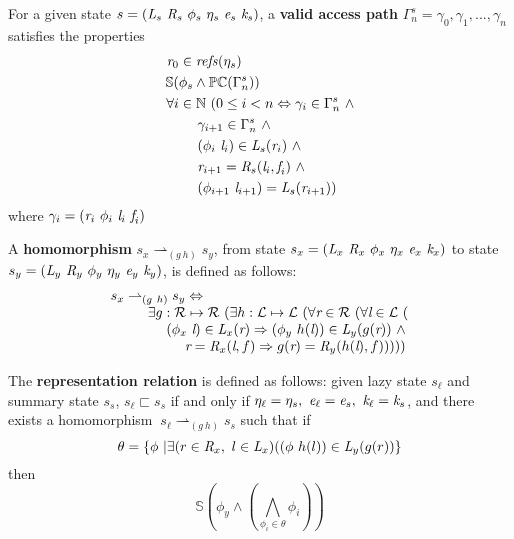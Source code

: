 \begin{definition}
For a given state $s= ( \cfgnt{L}_s\ \cfgnt{R}_s\ \phi_s\ \eta_s\ \cfgnt{e}_s\ \cfgnt{k}_s )$, a \textbf{valid access path} $\Gamma_n^s = \gamma_0,\gamma_1,...,\gamma_n$ satisfies the properties
\begin{align*}
\cfgnt{r}_0 &\in \mathit{refs}(\eta_s) \\
\mathbb{S}(&\phi_s \wedge \mathbb{PC}(\Gamma_n^s)) \\
\forall i & \in \mathbb{N}\ ( 0 \leq i < n \Leftrightarrow \gamma_i \in \Gamma_n^s\  \wedge\\
&\ \ \ \  \gamma_{i+1} \in \Gamma_n^s\  \wedge\\
&\ \ \ \  (\phi_i\ \cfgnt{l}_i)\in \cfgnt{L}_s(\cfgnt{r}_i)\ \wedge \\
&\ \ \ \  \cfgnt{r}_{i+1} = \cfgnt{R}_s(\cfgnt{l}_i,\cfgnt{f}_i)\ \wedge\\
&\ \ \ \ (\phi_{i+1}\ \cfgnt{l}_{i+1}) = \cfgnt{L}_s(\cfgnt{r}_{i+1}) )
\end{align*}
where $\gamma_i = (\emph{r}_i\ \phi_i\ \emph{l}_i\ \emph{f}_i)$
\end{definition}

\begin{definition}
A \textbf{homomorphism} $s_x \rightharpoonup_{(g\ h)} s_y$, from state $s_x = ( \cfgnt{L}_x\ \cfgnt{R}_x\ \phi_x\ \eta_x\ \cfgnt{e}_x\ \cfgnt{k}_x )$ to state $s_y = ( \cfgnt{L}_y\ \cfgnt{R}_y\ \phi_y\ \eta_y\ \cfgnt{e}_y\ \cfgnt{k}_y )$, is defined as follows: 
$$
\begin{array}{l}
 s_x \rightharpoonup_{(g\ h)} s_y \Leftrightarrow \\
\ \ \ \ \ \ \ \ \exists g:\mathcal{R} \mapsto \mathcal{R}\ ( \exists h: \mathcal{L} \mapsto \mathcal{L}\ (\forall \cfgnt{r} \in \mathcal{R}\ (\forall \cfgnt{l} \in \mathcal{L}\ ( \\ 
\ \ \ \ \ \ \ \ \ \ \ \ (\phi_x\ \cfgnt{l}) \in \cfgnt{L}_x(\cfgnt{r}) \Rightarrow (\phi_y\ h(\cfgnt{l}))\in \cfgnt{L}_y(g(\cfgnt{r}))\ \wedge \\
\ \ \ \ \ \ \ \ \ \ \ \ \ \ \ \ \cfgnt{r} = \cfgnt{R}_x(\cfgnt{l},f) \Rightarrow g(\cfgnt{r}) = \cfgnt{R}_y(h(\cfgnt{l}),f) )) )) 
\end{array}
$$
\end{definition}

\begin{definition}
\label{representation}
The \textbf{representation relation} is defined as follows: given lazy state $s_\ell$ and summary state $s_s$, $s_\ell \sqsubset s_s $ if and only if $\eta_{\ell} = \eta_{s} ,\ \cfgnt{e}_{\ell} = \cfgnt{e}_{s} ,\ \cfgnt{k}_{\ell} = \cfgnt{k}_{s}$, and there exists a homomorphism $\ s_\ell \rightharpoonup_{(g\ h)} s_s $ such that if $$\theta = \{ \phi\ | \exists (r \in \emph{R}_x,\  l \in \emph{L}_x) ( (\phi\ h(l)) \in \emph{L}_y (g(r))  \}$$ then 
\begin{equation}
\label{eqn:valid}
 \mathbb{S}( \phi_y \wedge (\bigwedge_{\phi_i \in \theta} \phi_i)) 
\end{equation}
\end{definition}

